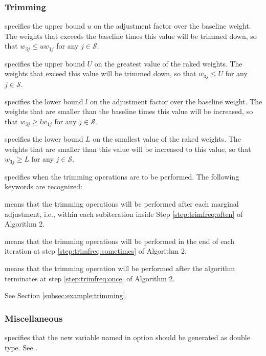 \subsubsection{Trimming}
\label{subsubsec:trimming}

\hangpara
{} specifies the upper bound $u$ on the adjustment
    factor over the baseline weight. The weights
    that exceeds the baseline times this value will be trimmed down,
    so that $w_{3j} \le u w_{1j}$ for any $j\in\mathcal{S}$.

\hangpara
{} specifies the upper bound $U$ on the greatest
    value of the raked weights.  The weights that
    exceed this value will be trimmed down, so that
    $w_{3j} \le U$ for any $j\in\mathcal{S}$.

\hangpara
{} specifies the lower bound $l$ on the adjustment factor
    over the baseline weight.  The weights that are smaller than the baseline
    times this value will be increased, so that
    $w_{3j} \ge l w_{1j}$ for any $j\in\mathcal{S}$.

\hangpara
{} specifies the lower bound $L$ on the smallest value
    of the raked weights.  The weights that are smaller than this value will
    be increased to this value, so that
    $w_{3j} \ge L$ for any $j\in\mathcal{S}$.

\hangpara
{} specifies when the trimming operations
    are to be performed. The following keywords are recognized:

\morehang {} means that the trimming operations will be performed
    after each marginal adjustment, i.e., within each subiteration inside
    Step \ref{step:trimfreq:often} of Algorithm 2.

\morehang {} means that the trimming operations will be performed
    in the end of each iteration at step \ref{step:trimfreq:sometimes} of
    Algorithm 2.

\morehang {}
means that the trimming operation will be performed after the algorithm terminates
at step \ref{step:trimfreq:once} of Algorithm 2.

See Section \ref{subsec:example:trimming}.

\subsubsection{Miscellaneous}

\hangpara
{} specifies that the new variable named in 
option should be generated as double type. See .


